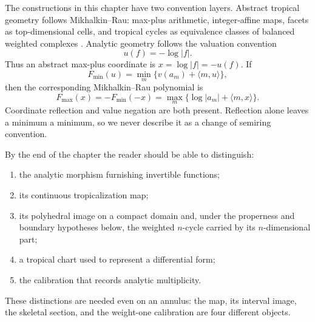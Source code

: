 The constructions in this chapter have two convention layers.  Abstract
tropical geometry follows Mikhalkin--Rau: max-plus arithmetic,
integer-affine maps, facets as top-dimensional cells, and tropical cycles as
equivalence classes of balanced weighted complexes
\cite[\S\S1.2--1.3, 4.2]{MR18Tropical}.  Analytic geometry follows the
valuation convention
\[
                         u(f)=-\log|f|.
\]
Thus an abstract max-plus coordinate is $x=\log|f|=-u(f)$.  If
\[
 F_{\min}(u)=\min_m\{v(a_m)+\langle m,u\rangle\},
\]
then the corresponding Mikhalkin--Rau polynomial is
\begin{equation}
\label{eq:analytic-max-min-firewall}
 F_{\max}(x)=-F_{\min}(-x)
 =\max_m\{\log|a_m|+\langle m,x\rangle\}.
\end{equation}
Coordinate reflection and value negation are both present.  Reflection
alone leaves a minimum a minimum, so we never describe it as a change of
semiring convention.

By the end of the chapter the reader should be able to distinguish:
\begin{enumerate}
\item the analytic morphism furnishing invertible functions;
\item its continuous tropicalization map;
\item its polyhedral image on a compact domain and, under the properness
  and boundary hypotheses below, the weighted $n$-cycle carried by its
  $n$-dimensional part;
\item a tropical chart used to represent a differential form;
\item the calibration that records analytic multiplicity.
\end{enumerate}
These distinctions are needed even on an annulus: the map, its interval
image, the skeletal section, and the weight-one calibration are four
different objects.

